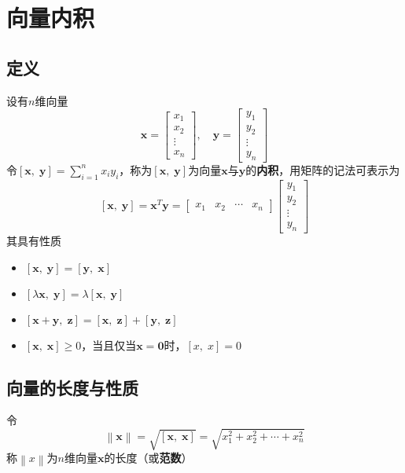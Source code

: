 \documentclass[UTF8]{ctexart}
\newcommand{\dotprod}[2]{\left[{#1},\;{#2}\right]}
\newcommand{\ve}[1]{{\bm{#1}}}
\newcommand{\mat}[1]{\ve{#1}}
\newcommand{\norm}[1]{{\left\|#1\right\|}}
\begin{document}
\section*{向量内积}
\subsection*{定义}
设有$n$维向量
\[\mat{x}=\begin{bmatrix}
x_1\\
x_2\\
\vdots\\
x_n
\end{bmatrix},\quad
\mat{y}=\begin{bmatrix}
y_1\\
y_2\\
\vdots\\
y_n
\end{bmatrix}\]
令$\dotprod{\mat{x}}{\mat{y}}=\sum_{i=1}^nx_iy_i$，称为$\dotprod{\mat{x}}{\mat{y}}$为向量$\mat{x}$与$\mat{y}$的\textbf{内积}，用矩阵的记法可表示为
\[\dotprod{\mat{x}}{\mat{y}}=\mat{x}^T\mat{y}=\begin{bmatrix}
x_1&x_2&\cdots&x_n
\end{bmatrix}\begin{bmatrix}
y_1\\
y_2\\
\vdots\\
y_n
\end{bmatrix}\]
其具有性质
\begin{itemize}
  \item $\dotprod{\mat{x}}{\mat{y}}=\dotprod{\mat{y}}{\mat{x}}$
  \item $\dotprod{\lambda\mat{x}}{\mat{y}}=\lambda\dotprod{\mat{x}}{\mat{y}}$
  \item $\dotprod{\mat{x}+\mat{y}}{\mat{z}}=\dotprod{\mat{x}}{\mat{z}}+\dotprod{\mat{y}}{\mat{z}}$
  \item $\dotprod{\mat{x}}{\mat{x}}\ge0$，当且仅当$\mat{x}=\mat{0}$时，$\dotprod{x}{x}=0$
\end{itemize}
\subsection*{向量的长度与性质}
令
\[\norm{\mat{x}}=\sqrt{\dotprod{\mat{x}}{\mat{x}}}=\sqrt{x_1^2+x_2^2+\cdots+x_n^2}\]
称$\norm{x}$为$n$维向量$\mat{x}$的长度（或\textbf{范数}）
\end{document}
